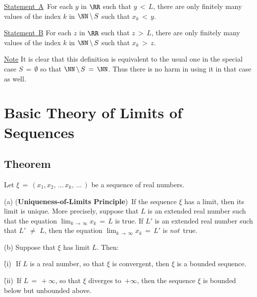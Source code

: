         \h \underline{Statement~A}\, For each $y$ in ${\RR}$ such that $y\,<\,L$,
    there are only finitely many values of the index $k$ in ${\NN}\,{\setminus}\,S$ such that $x_{k}\,<\,y$.

        \h \underline{Statement~B} For each $z$ in ${\RR}$ such that $z\,>\,L$,
    there are only finitely many values of the index $k$ in ${\NN}\,{\setminus}\,S$ such that $x_{k}\,>\,z$.

\V

         \underline{Note} It is clear that this definition is equivalent to the usual one
    in the special case $S \,=\, {\emptyset}$ so that ${\NN}\,{\setminus}\,S \,=\, {\NN}$.
    Thus there is no harm in using it in that case as well.


                \section{{\bf Basic Theory of Limits of Sequences}}
                \label{SectC20}

\V

            \subsection{\small{\bf Theorem}}
            \label{ThmC20.10A}

\V

        Let ${\xi} \,=\, (x_{1},x_{2},\,{\ldots}\,x_{k},\,{\ldots}\,)$ be a sequence of real numbers.

\V

        (a) ({\bf Uniqueness-of-Limits Principle})\,
    If the sequence ${\xi}$ has a limit, then its limit is unique. More precisely, suppose that $L$ is an extended real number such that the equation
    $\lim_{k \,{\rightarrow}\, {\infty}}  x_{k}\,=\, L$ is true. If $L'$ is an extended real number such that $L' \,\,{\neq}\,\, L$,
    then the equation $\lim_{k \,{\rightarrow}\, {\infty}} x_{k} \,=\, L'$ is {\em not}~true.


\V

        (b) Suppose that ${\xi}$ has limit $L$. Then:

        \h (i)\,\, If $L$ is a real number, so that ${\xi}$ is convergent, then ${\xi}$ is a bounded sequence.

        \h (ii)\, If $L \,=\, +{\infty}$, so that ${\xi}$ diverges to~$+{\infty}$,
    then the sequence ${\xi}$ is bounded below but unbounded above.

